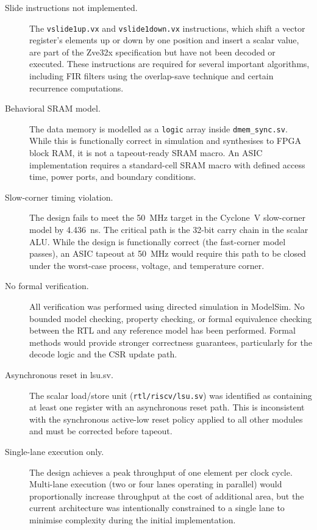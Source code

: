\begin{description}

  \item[Slide instructions not implemented.]
    The \texttt{vslide1up.vx} and \texttt{vslide1down.vx} instructions, which shift
    a vector register's elements up or down by one position and insert a scalar value,
    are part of the Zve32x specification but have not been decoded or executed.
    These instructions are required for several important algorithms, including FIR
    filters using the overlap-save technique and certain recurrence computations.

  \item[Behavioral SRAM model.]
    The data memory is modelled as a \texttt{logic} array inside \texttt{dmem\_sync.sv}.
    While this is functionally correct in simulation and synthesises to FPGA block RAM,
    it is not a tapeout-ready SRAM macro. An ASIC implementation requires a standard-cell
    SRAM macro with defined access time, power ports, and boundary conditions.

  \item[Slow-corner timing violation.]
    The design fails to meet the 50~MHz target in the Cyclone~V slow-corner model by
    4.436~ns. The critical path is the 32-bit carry chain in the scalar ALU.
    While the design is functionally correct (the fast-corner model passes), an ASIC
    tapeout at 50~MHz would require this path to be closed under the worst-case
    process, voltage, and temperature corner.

  \item[No formal verification.]
    All verification was performed using directed simulation in ModelSim. No bounded
    model checking, property checking, or formal equivalence checking between the RTL
    and any reference model has been performed. Formal methods would provide stronger
    correctness guarantees, particularly for the decode logic and the CSR update path.

  \item[Asynchronous reset in lsu.sv.]
    The scalar load/store unit (\texttt{rtl/riscv/lsu.sv}) was identified as containing
    at least one register with an asynchronous reset path. This is inconsistent with
    the synchronous active-low reset policy applied to all other modules and must be
    corrected before tapeout.

  \item[Single-lane execution only.]
    The design achieves a peak throughput of one element per clock cycle. Multi-lane
    execution (two or four lanes operating in parallel) would proportionally increase
    throughput at the cost of additional area, but the current architecture was
    intentionally constrained to a single lane to minimise complexity during the
    initial implementation.

\end{description}

